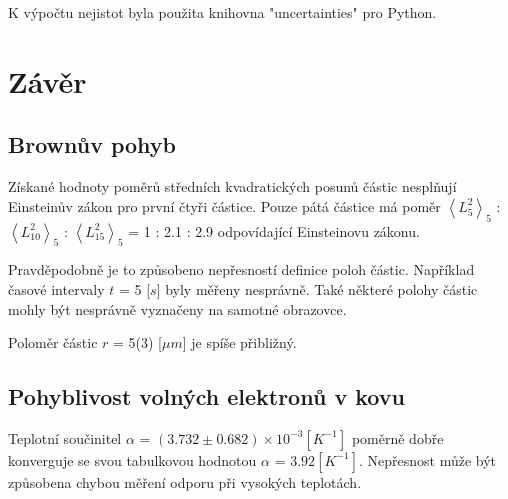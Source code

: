 \documentclass[a4paper,11pt]{article}
\begin{document}
    \hspace{10pt}
    \begin{minipage}[t]{0.5\textwidth} 
        K výpočtu nejistot byla použita knihovna "uncertainties" pro Python. 
        \section{Závěr}
            \subsection{Brownův pohyb}
                Získané hodnoty poměrů středních kvadratických posunů částic nesplňují Einsteinův zákon pro první čtyři částice. Pouze pátá částice má poměr $\left\langle L_{5}^2\right\rangle_5$ : $\left\langle L_{10}^2\right\rangle_5$ : $\left\langle L_{15}^2\right\rangle_5$ = 1 : 2.1 : 2.9 odpovídající Einsteinovu zákonu. 
                \par Pravděpodobně je to způsobeno nepřesností definice poloh částic. Například časové intervaly $t$ = 5 [$s$] byly měřeny nesprávně. Také některé polohy částic mohly být nesprávně vyznačeny na samotné obrazovce. 
                \par Poloměr částic $r$ = 5(3) [$\mu m$] je spíše přibližný. 
            \subsection{Pohyblivost volných elektronů v kovu}
                Teplotní součinitel $\alpha$ = $(3.732 \pm 0.682) \times 10^{-3} [K^{-1}]$ poměrně dobře konverguje se svou tabulkovou hodnotou $\alpha$ = $3.92 [K^{-1}]$. Nepřesnost může být způsobena chybou měření odporu při vysokých teplotách.
    \end{minipage}
\end{document}
